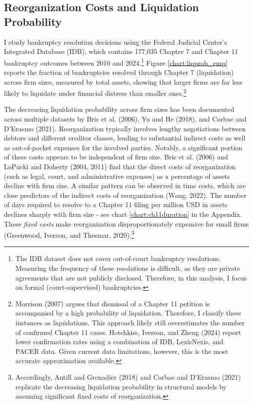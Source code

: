 \documentclass[12pt]{article}
\begin{document}
\subsection{Reorganization Costs and Liquidation Probability \label{sec:emp liqprob}} 

I study bankruptcy resolution decisions using the Federal Judicial Center's Integrated Database (IDB), which contains 177,035 Chapter 7 and Chapter 11 bankruptcy outcomes between 2010 and 2024.\footnote{The IDB dataset does not cover out-of-court bankruptcy resolutions. Measuring the frequency of these resolutions is difficult, as they are private agreements that are not publicly disclosed. Therefore, in this analysis, I focus on formal (court-supervised) bankruptcies.} Figure \ref{chart:liqprob_emp} reports the fraction of bankruptcies resolved through Chapter 7 (liquidation) across firm sizes, measured by total assets, showing that larger firms are far less likely to liquidate under financial distress than smaller ones.\footnote{Morrison (2007) argues that dismissal of a Chapter 11 petition is accompanied by a high probability of liquidation. Therefore, I classify these instances as liquidations. This approach likely still overestimates the number of confirmed Chapter 11 cases. Hotchkiss, Iverson, and Zheng (2024) report lower confirmation rates using a combination of IDB, LexisNexis, and PACER data. Given current data limitations, however, this is the most accurate approximation available.} 

The decreasing liquidation probability across firm sizes has been documented across multiple datasets by Bris et al. (2006), Yu and He (2018), and Corbae and D'Erasmo (2021). Reorganization typically involves lengthy negotiations between debtors and different creditor classes, leading to substantial indirect costs as well as out-of-pocket expenses for the involved parties. Notably, a significant portion of these costs appears to be independent of firm size. Bris et al. (2006) and LoPucki and Doherty (2004, 2011) find that the direct costs of reorganization (such as legal, court, and administrative expenses) as a percentage of assets decline with firm size. A similar pattern can be observed in time costs, which are close predictors of the indirect costs of reorganization (Wang, 2022). The number of days required to resolve to a Chapter 11 filing per million USD in assets declines sharply with firm size - see chart \ref{chart:ch11duration} in the Appendix. These \textit{fixed costs} make reorganization disproportionately expensive for small firms (Greenwood, Iverson, and Thesmar, 2020).\footnote{Accordingly, Antill and Grenadier (2018) and Corbae and D'Erasmo (2021) replicate the decreasing liquidation probability in structural models by assuming significant fixed costs of reorganization.} 
\end{document}
